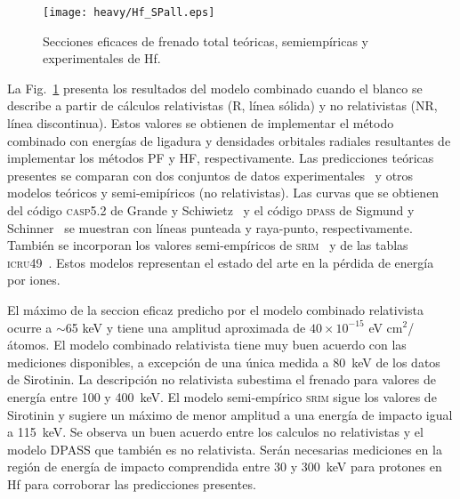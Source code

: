 
\begin{figure}[t]
\centering
\texttt{[image: heavy/Hf\_SPall.eps]}
\caption[Secciones eficaces teóricas, semiempíricas y experimentales de 
Hf.]{Secciones eficaces de frenado total teóricas, semiempíricas y
experimentales de Hf.}
\label{fig:Hf_SPall}
\end{figure}

La Fig.~\ref{fig:Hf_SPall} presenta los resultados del modelo combinado 
cuando el blanco se describe a partir de cálculos relativistas (R, 
línea sólida) y no relativistas (NR, línea discontinua). Estos valores 
se obtienen de implementar el método combinado con energías de ligadura
y densidades orbitales radiales resultantes de implementar los métodos 
PF y HF, respectivamente. Las predicciones teóricas presentes se 
comparan con dos conjuntos de datos 
experimentales~\cite{Montanari:20,Sirotinin:84} y otros modelos teóricos 
y semi-emipíricos (no relativistas). Las curvas que se obtienen del 
código \textsc{casp5.2} de Grande y Schiwietz~\cite{Grande:01,casp52} y 
el código \textsc{dpass} de Sigmund y Schinner~\cite{DPASS20} se 
muestran con líneas punteada y raya-punto, respectivamente. También se 
incorporan los valores semi-empíricos de \textsc{srim}~\cite{Ziegler01} 
y de las tablas \textsc{icru49}~\cite{ICRU49}. Estos modelos representan
el estado del arte en la pérdida de energía por iones.

El máximo de la seccion eficaz predicho por el modelo combinado 
relativista ocurre a $\sim$65 keV y tiene una amplitud aproximada de 
$40\times 10^{-15}$ eV cm$^2$/átomos. 
El modelo combinado relativista tiene muy buen acuerdo con las 
mediciones disponibles, a excepción de una única medida a 80~keV de los 
datos de Sirotinin. La descripción no relativista subestima el frenado 
para valores de energía entre 100 y 400~keV. El modelo semi-empírico 
\textsc{srim} sigue los valores de Sirotinin y 
sugiere un máximo de menor amplitud a una energía de impacto igual a 
115~keV. Se observa un buen acuerdo entre los calculos no relativistas 
y el modelo DPASS que también es no relativista. 
Serán necesarias mediciones en la región de energía de impacto 
comprendida entre 30 y 300~keV para protones en Hf para corroborar las 
predicciones presentes. 


